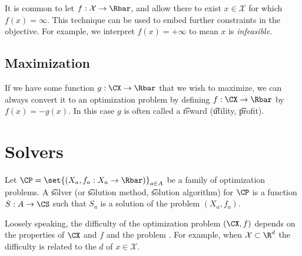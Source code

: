 It is common to let $f: \mathcal{X}  \to \Rbar$, and allow there to exist $x \in \mathcal{X} $ for which $f(x) = \infty$.
This technique can be used to embed further constraints in the objective.
For example, we interpret $f(x) = +\infty$ to mean $x$ is \textit{infeasible}.

\subsection*{Maximization}

If we have some function $g: \CX \to \Rbar$ that we wish to maximize, we can always convert it to an optimization problem by defining $f: \CX \to \Rbar$ by $f(x) = -g(x)$.
In this case $g$ is often called a \t{reward} (\t{utility}, \t{profit}).

\section*{Solvers}

Let $\CP = \set{(X_a, f_a: X_a \to \Rbar)}_{a \in A}$ be a family of optimization problems.
A \t{solver} (or \t{solution method}, \t{solution algorithm}) for $\CP$ is a function $S: A \to \CS$ such that $S_a$ is a solution of the problem $(X_a, f_a)$.

Loosely speaking, the difficulty of  the optimization problem $(\CX, f)$ depends on the properties of $\CX$ and $f$ and the problem .
For example, when $\mathcal{X}  \subset \R ^d$ the difficulty is related to the  $d$ of $x \in \mathcal{X} $.
